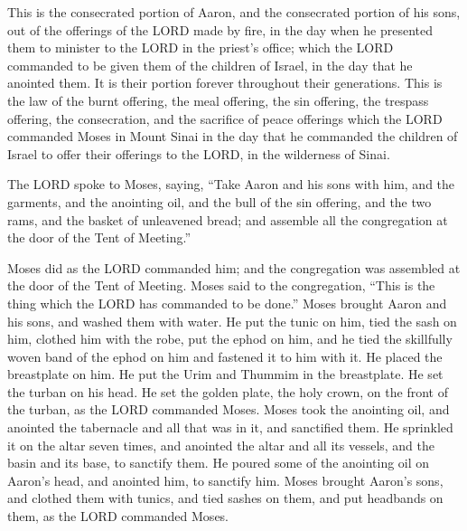 \myverse{}This is the consecrated portion of Aaron, and the consecrated
portion of his sons, out of the offerings of the LORD made by fire, in the day when he presented them
to minister to the LORD in the priest’s office;
\myverse{}which the LORD commanded to be given them of the children of Israel, in the
day that he anointed them. It is their portion forever throughout their generations.
\myverse{}This is the law of the burnt offering, the meal offering, the sin offering,
the trespass offering, the consecration, and the sacrifice of peace offerings
\myverse{}which the LORD commanded Moses in Mount Sinai in the day that he commanded
the children of Israel to offer their offerings to the LORD, in the wilderness of Sinai.


\mychapter{} \myverse*{}The LORD spoke to Moses, saying,
\myverse{}“Take Aaron and his sons with him, and the garments, and the anointing oil,
and the bull of the sin offering, and the two rams, and the basket of unleavened bread;
\myverse{}and assemble all the congregation at the door of the Tent of Meeting.”


\myverse{}Moses did as the LORD commanded him; and the congregation was assembled
at the door of the Tent of Meeting.
\myverse{}Moses said to the congregation, “This is the thing which the LORD has commanded
to be done.”
\myverse{}Moses brought Aaron and his sons, and washed them with water.
\myverse{}He put the tunic on him, tied the sash on him, clothed him with the robe, put
the ephod on him, and he tied the skillfully woven band of the ephod on him and fastened it to him with
it.
\myverse{}He placed the breastplate on him. He put the Urim and Thummim in the breastplate.
\myverse{}He set the turban on his head. He set the golden plate, the holy crown, on the
front of the turban, as the LORD commanded Moses.
\myverse{}Moses took the anointing oil, and anointed the tabernacle and all that was
in it, and sanctified them.
\myverse{}He sprinkled it on the altar seven times, and anointed the altar and all its
vessels, and the basin and its base, to sanctify them.
\myverse{}He poured some of the anointing oil on Aaron’s head, and anointed him, to
sanctify him.
\myverse{}Moses brought Aaron’s sons, and clothed them with tunics, and tied sashes
on them, and put headbands on them, as the LORD commanded Moses.


